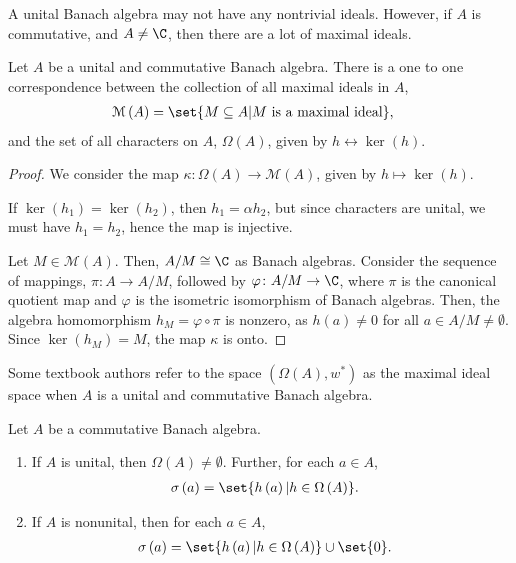 \documentclass[10pt]{mypackage}
\begin{document}
A unital Banach algebra may not have any nontrivial ideals. However, if $A$ is commutative, and $A\neq \C$, then there are a lot of maximal ideals.
\begin{theorem}
  Let $A$ be a unital and commutative Banach algebra. There is a one to one correspondence between the collection of all maximal ideals in $A$,
  \begin{align*}
    \mathcal{M}\left(A\right) &= \set{M\subseteq A | M\text{ is a maximal ideal}},
  \end{align*}
  and the set of all characters on $A$, $\Omega(A)$, given by $h\leftrightarrow \ker\left(h\right)$.
\end{theorem}
\begin{proof}
  We consider the map $\kappa\colon \Omega\left(A\right)\rightarrow \mathcal{M}\left(A\right)$, given by $h\mapsto \ker\left(h\right)$.\newline

  If $\ker\left(h_1\right) = \ker\left(h_2\right)$, then $h_1 = \alpha h_2$, but since characters are unital, we must have $h_1 = h_2$, hence the map is injective.\newline

  Let $M\in \mathcal{M}\left(A\right)$. Then, $A/M\cong \C$ as Banach algebras. Consider the sequence of mappings, $\pi\colon A\rightarrow A/M$, followed by $\varphi\colon A/M\rightarrow \C$, where $\pi$ is the canonical quotient map and $\varphi$ is the isometric isomorphism of Banach algebras. Then, the algebra homomorphism $h_{M} = \varphi\circ \pi$ is nonzero, as $h(a)\neq 0$ for all $a\in A/M\neq \emptyset$. Since $\ker\left(h_M\right) = M$, the map $\kappa$ is onto.
\end{proof}
\begin{remark}
  Some textbook authors refer to the space $\left(\Omega\left(A\right),w^{\ast}\right)$ as the maximal ideal space when $A$ is a unital and commutative Banach algebra.
\end{remark}
\begin{theorem}
  Let $A$ be a commutative Banach algebra.
  \begin{enumerate}[(1)]
    \item If $A$ is unital, then $\Omega\left(A\right)\neq \emptyset$. Further, for each $a\in A$,
      \begin{align*}
        \sigma\left(a\right) &= \set{h\left(a\right) | h\in \Omega\left(A\right)}.
      \end{align*}
    \item If $A$ is nonunital, then for each $a\in A$,
      \begin{align*}
        \sigma\left(a\right) &= \set{h\left(a\right)| h\in \Omega\left(A\right)} \cup \set{0}.
      \end{align*}
  \end{enumerate}
\end{theorem}
\end{document}

